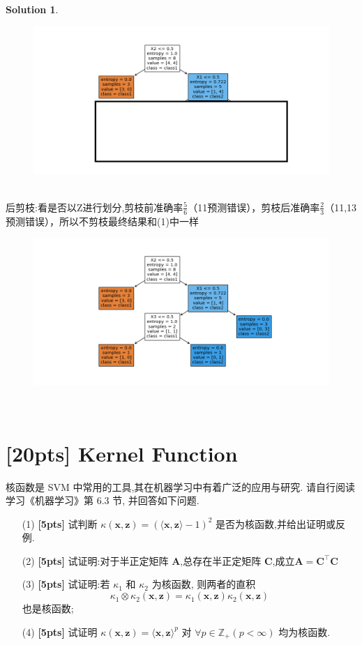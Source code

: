 \documentclass[a4paper,UTF8]{article}
\numberwithin{equation}{section}
\theoremstyle{definition}
\newtheorem*{solution}{Solution}
\def \A {\mathbf{A}}
\def \C {\mathbf{C}}
\def \x {\mathbf{x}}
\def \z {\mathbf{z}}
\begin{document}
\begin{solution}
\begin{figure}[htbp]
	\centering
	\includegraphics[scale=0.7]{Q4tree(2)1.png}
\end{figure}\\
后剪枝:看是否以Z进行划分,剪枝前准确率$\frac{5}{6}$（11预测错误），剪枝后准确率$\frac{2}{3}$（11,13预测错误），所以不剪枝最终结果和(1)中一样\\
\begin{figure}[htbp]
	\centering
	\includegraphics[scale=0.7]{Q4tree.png}
\end{figure}
~\\
\end{solution}

\newpage

\section{[20pts] Kernel Function}
核函数是 SVM 中常用的工具,其在机器学习中有着广泛的应用与研究. 请自行阅读学习《机器学习》第 6.3 节, 并回答如下问题.
\begin{enumerate}
	\item[(1)] \textbf{[5pts]} 试判断 $\kappa(\x, \z) = \left(\langle\x, \z\rangle - 1\right)^2$ 是否为核函数,并给出证明或反例.
	\item[(2)] \textbf{[5pts]} 试证明:对于半正定矩阵 $\A$,总存在半正定矩阵 $\C$,成立$\A = \C^\top \C$
	\item[(3)] \textbf{[5pts]} 试证明:若 $\kappa_1$ 和 $\kappa_2$ 为核函数, 则两者的直积
	\[
	\kappa_1 \otimes \kappa_2(\x, \z)=\kappa_1(\x, \z) \kappa_2(\x, \z)
	\]
	也是核函数;
	\item[(4)] \textbf{[5pts]} 试证明 $\kappa(\x, \z) = \langle\x, \z\rangle^p$ 对 $\forall p\in\mathbb{Z}_+(p<\infty)$ 均为核函数.

	
\end{enumerate}
\end{document}
